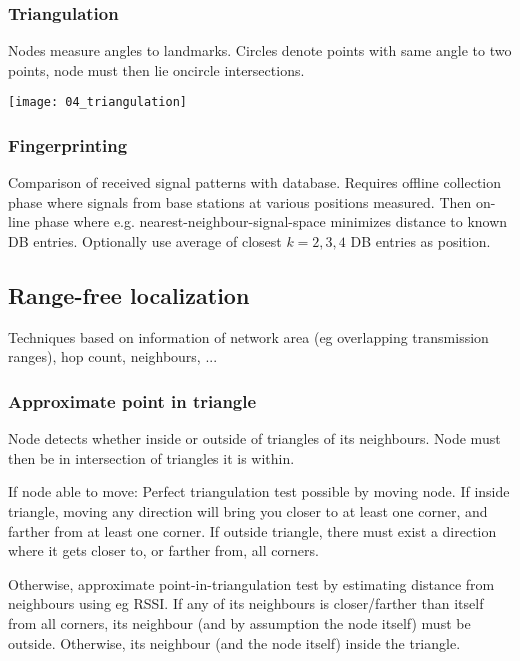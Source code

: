 \subsubsection{Triangulation}

Nodes measure angles to landmarks. Circles denote points with same angle to two
points, node must then lie oncircle intersections.

\texttt{[image: 04\_triangulation]}

\subsubsection{Fingerprinting}

Comparison of received signal patterns with database. Requires offline
collection phase where signals from base stations at various positions
measured. Then on-line phase where e.g. nearest-neighbour-signal-space
minimizes distance to known DB entries. Optionally use average of closest $k =
2, 3, 4$ DB entries as position.

\subsection{Range-free localization}

Techniques based on information of network area (eg overlapping transmission
ranges), hop count, neighbours, ...

\subsubsection{Approximate point in triangle}

Node detects whether inside or outside of triangles of its neighbours. Node
must then be in intersection of triangles it is within.

If node able to move: Perfect triangulation test possible by moving node. If
inside triangle, moving any direction will bring you closer to at least one
corner, and farther from at least one corner. If outside triangle, there must
exist a direction where it gets closer to, or farther from, all corners.

Otherwise, approximate point-in-triangulation test by estimating distance from
neighbours using eg RSSI. If any of its neighbours is closer/farther than
itself from all corners, its neighbour (and by assumption the node itself) must
be outside. Otherwise, its neighbour (and the node itself) inside the triangle.

